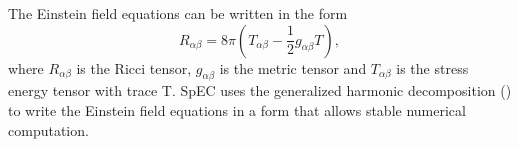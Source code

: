 %
The Einstein field equations can be written in the form
%
\begin{equation}
  \label{eqn:efe}
R_{\alpha\beta} = 8\pi\left(T_{\alpha\beta} - \frac{1}{2} g_{\alpha\beta}T\right),
\end{equation}
%
where $R_{\alpha\beta}$ is the Ricci tensor, $ g_{\alpha\beta}$ is the metric tensor and $T_{\alpha\beta}$ is the stress energy tensor with trace T. SpEC uses the generalized harmonic decomposition (\citet*{lindblom2006}) to write the Einstein field equations in a form that allows stable numerical computation.


